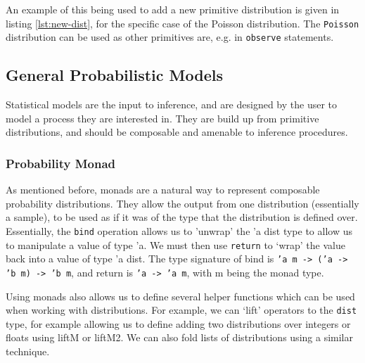 An example of this being used to add a new primitive distribution is given in listing \ref{lst:new-dist}, for the specific case of the Poisson distribution. The \texttt{Poisson} distribution can be used as other primitives are, e.g. in \texttt{observe} statements.
	
	
\subsection{General Probabilistic Models}
Statistical models are the input to inference, and are designed by the user to model a process they are interested in. They are build up from primitive distributions, and should be composable and amenable to inference procedures.

\subsubsection{Probability Monad}
	
As mentioned before, monads are a natural way to represent composable probability distributions. They allow the output from one distribution (essentially a sample), to be used as if it was of the type that the distribution is defined over. Essentially, the \texttt{bind} operation allows us to 'unwrap' the 'a dist type to allow us to manipulate a value of type 'a. We must then use \texttt{return} to `wrap' the value back into a value of type 'a dist. The type signature of bind is \texttt{'a m -> ('a -> 'b m) -> 'b m}, and return is \texttt{'a -> 'a m}, with m being the monad type.
	
Using monads also allows us to define several helper functions which can be used when working with distributions. For example, we can `lift' operators to the \texttt{dist} type, for example allowing us to define adding two distributions over integers or floats using liftM or liftM2. We can also fold lists of distributions using a similar technique.
	
